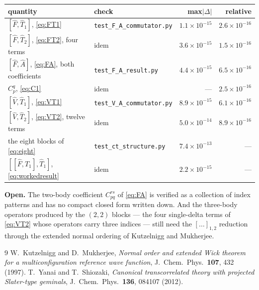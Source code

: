 \documentclass[11pt]{article}
\begin{document}
\begin{center}
\footnotesize
\begin{tabular}{@{}llrr@{}}
\toprule
quantity & check & max$|\Delta|$ & relative \\
\midrule
$[\hat F,\hat T_1]$, \eqref{eq:FT1} & \texttt{test\_F\_A\_commutator.py}
  & $1.1\times10^{-15}$ & $2.6\times10^{-16}$ \\
$[\hat F,\hat T_2]$, \eqref{eq:FT2}, four terms & idem
  & $3.6\times10^{-15}$ & $1.5\times10^{-16}$ \\
$[\hat F,\hat A]$, \eqref{eq:FA}, both coefficients & \texttt{test\_F\_A\_result.py}
  & $4.4\times10^{-15}$ & $6.5\times10^{-16}$ \\
$C^q_p$, \eqref{eq:C1} & idem & --- & $2.5\times10^{-16}$ \\
$[\hat V,\hat T_1]$, \eqref{eq:VT1} & \texttt{test\_V\_A\_commutator.py}
  & $8.9\times10^{-15}$ & $6.1\times10^{-16}$ \\
$[\hat V,\hat T_2]$, \eqref{eq:VT2}, twelve terms & idem
  & $5.0\times10^{-14}$ & $8.9\times10^{-16}$ \\
the eight blocks of \eqref{eq:eight} & \texttt{test\_ct\_structure.py}
  & $7.4\times10^{-13}$ & --- \\
$[[\hat F,\hat T_1],\hat T_1]$, \eqref{eq:workedresult} & idem
  & $2.2\times10^{-15}$ & --- \\
\bottomrule
\end{tabular}
\end{center}

\noindent
\textbf{Open.} The two-body coefficient $C^{rs}_{pq}$ of \eqref{eq:FA} is
verified as a collection of index patterns and has no compact closed form
written down. And the three-body operators produced by the $(2,2)$ blocks ---
the four single-delta terms of \eqref{eq:VT2} whose operators carry three
indices --- still need the $[\dots]_{1,2}$ reduction through the extended normal
ordering of Kutzelnigg and Mukherjee.

\begin{thebibliography}{9}
 W.~Kutzelnigg and D.~Mukherjee,
  \emph{Normal order and extended Wick theorem for a multiconfiguration
  reference wave function}, J.~Chem.~Phys.\ \textbf{107}, 432 (1997).
 T.~Yanai and T.~Shiozaki,
  \emph{Canonical transcorrelated theory with projected Slater-type geminals},
  J.~Chem.~Phys.\ \textbf{136}, 084107 (2012).
\end{thebibliography}
\end{document}
